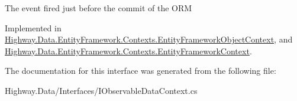 The event fired just before the commit of the O\-R\-M 



Implemented in \hyperlink{class_highway_1_1_data_1_1_entity_framework_1_1_contexts_1_1_entity_framework_object_context_a0c33a6b51babf17fcc2d61e396dd8bf9}{Highway.\-Data.\-Entity\-Framework.\-Contexts.\-Entity\-Framework\-Object\-Context}, and \hyperlink{class_highway_1_1_data_1_1_entity_framework_1_1_contexts_1_1_entity_framework_context_a4e307f212412dfd562cd70640d67709b}{Highway.\-Data.\-Entity\-Framework.\-Contexts.\-Entity\-Framework\-Context}.



The documentation for this interface was generated from the following file\-:\begin{DoxyCompactItemize}
\item 
Highway.\-Data/\-Interfaces/I\-Observable\-Data\-Context.\-cs\end{DoxyCompactItemize}
